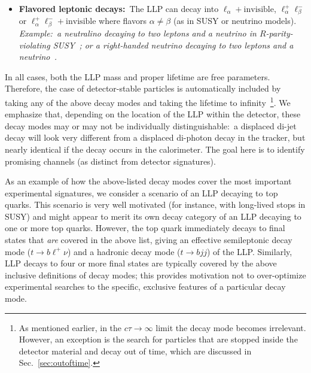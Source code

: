 \begin{itemize}
\item {\bf Flavored leptonic decays:}~The LLP can decay into $\ell_\alpha+\mathrm{invisible}$, $\ell_\alpha^+\ell_\beta^-$ or $\ell_\alpha^+\ell_\beta^-+\mathrm{invisible}$ where flavors $\alpha\neq\beta$ (as in SUSY or neutrino models).
\emph{Example:~a neutralino decaying to two leptons and a neutrino in $R$-parity-violating SUSY~\cite{Barbier:2004ez}; or a right-handed neutrino decaying to two leptons and a neutrino~\cite{delAguila:2008cj}.}
\end{itemize}

In all cases, both the LLP mass and proper lifetime are free parameters.
Therefore, the case of detector-stable particles is automatically included by taking any of the above decay modes and taking the lifetime to infinity~\footnote{As mentioned earlier, in the $c\tau\rightarrow\infty$ limit the decay mode becomes irrelevant. However, an exception is the search for particles that are stopped inside the detector material and decay out of time, which are discussed in Sec.~\ref{sec:outoftime}.}.
We emphasize that, depending on the location of the LLP within the detector, these decay modes may or may not be individually distinguishable:~a displaced di-jet decay will look very different from a displaced di-photon decay in the tracker, but nearly identical if the decay occurs in the calorimeter.
The goal here is to identify  promising channels (as distinct from detector signatures). 

As an example of how the above-listed decay modes cover the most important experimental signatures, we consider a scenario of an LLP decaying to top quarks.
This scenario is very well motivated (for instance, with long-lived stops in SUSY) and might appear to merit its own decay category of an LLP decaying to one or more top quarks.
However, the top quark immediately decays to final states that \emph{are} covered in the above list, giving an effective semileptonic decay mode ($t\rightarrow b\ell^+\nu$) and a hadronic decay mode ($t\rightarrow bjj$) of the LLP.
Similarly, LLP decays to four or more final states are typically covered by the above inclusive definitions of decay modes; this provides motivation not to over-optimize experimental searches to the specific, exclusive features of a particular decay mode.

